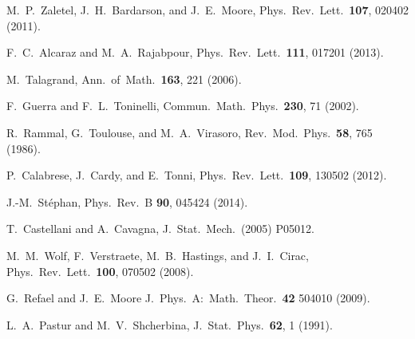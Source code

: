 \documentclass[twocolumn,superscriptaddress,prb,10pt]{revtex4-1}
\begin{document}
\begin{thebibliography}{99}
M.~P.~Zaletel, J.~H.~Bardarson, and J.~E.~Moore, Phys.\ Rev.\ Lett.\ {\bf 107}, 
020402 (2011).

F.~C.~Alcaraz and M.~A.~Rajabpour, Phys.\ Rev.\ Lett.\ {\bf 111}, 017201 (2013).

M.~Talagrand, Ann.\ of\ Math.\ {\bf 163}, 221 (2006). 

F.~Guerra and F.~L.~Toninelli, Commun.\ Math.\ Phys.\ {\bf 230}, 71 (2002). 

R.~Rammal, G.~Toulouse, and M.~A.~Virasoro, Rev.\ Mod.\ Phys.\ {\bf 58}, 765 
(1986).

P.~Calabrese, J.~Cardy, and E.~Tonni, Phys.\ Rev.\ Lett.\ {\bf 109}, 
130502 (2012). 

J.-M.~St\'ephan, Phys.\ Rev.\ B {\bf 90}, 045424 (2014). 

T.~Castellani and A.~Cavagna, J.\ Stat.\ Mech.\ (2005) P05012. 

M.~M.~Wolf, F.~Verstraete, M.~B.~Hastings, and J.~I.~Cirac, Phys.\ Rev.\ Lett.\ 
{\bf 100}, 070502 (2008). 

G.~Refael and J.~E.~Moore J.\ Phys.\ A:\ Math.\ Theor.\ {\bf 42} 504010 (2009).

L.~A.~Pastur and M.~V.~Shcherbina, J.\ Stat.\ Phys.\ {\bf 62}, 1 (1991).

\end{thebibliography}
\end{document}
